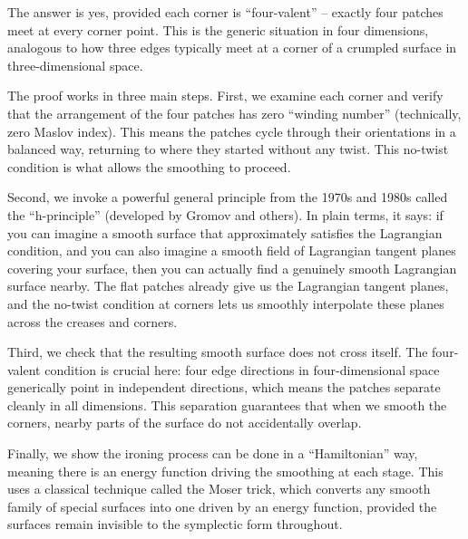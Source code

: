 The answer is yes, provided each corner is ``four-valent'' -- exactly four
patches meet at every corner point. This is the generic situation in four
dimensions, analogous to how three edges typically meet at a corner of a
crumpled surface in three-dimensional space.

The proof works in three main steps. First, we examine each corner and
verify that the arrangement of the four patches has zero ``winding number''
(technically, zero Maslov index). This means the patches cycle through
their orientations in a balanced way, returning to where they started
without any twist. This no-twist condition is what allows the smoothing
to proceed.

Second, we invoke a powerful general principle from the 1970s and 1980s
called the ``h-principle'' (developed by Gromov and others). In plain
terms, it says: if you can imagine a smooth surface that approximately
satisfies the Lagrangian condition, and you can also imagine a smooth
field of Lagrangian tangent planes covering your surface, then you can
actually find a genuinely smooth Lagrangian surface nearby. The flat
patches already give us the Lagrangian tangent planes, and the no-twist
condition at corners lets us smoothly interpolate these planes across
the creases and corners.

Third, we check that the resulting smooth surface does not cross itself.
The four-valent condition is crucial here: four edge directions in
four-dimensional space generically point in independent directions, which
means the patches separate cleanly in all dimensions. This separation
guarantees that when we smooth the corners, nearby parts of the surface
do not accidentally overlap.

Finally, we show the ironing process can be done in a ``Hamiltonian'' way,
meaning there is an energy function driving the smoothing at each stage.
This uses a classical technique called the Moser trick, which converts any
smooth family of special surfaces into one driven by an energy function,
provided the surfaces remain invisible to the symplectic form throughout.
